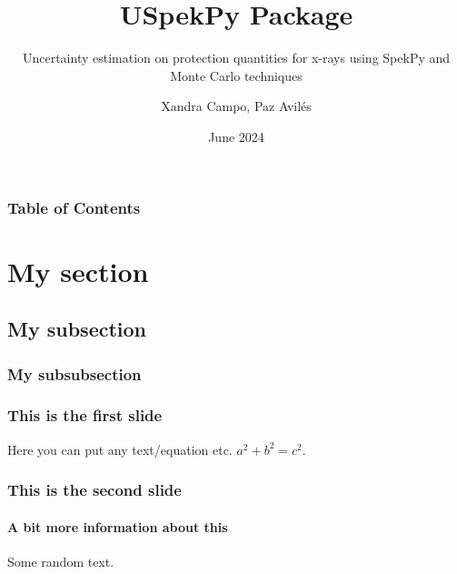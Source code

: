 \documentclass{beamer}
\title{USpekPy Package}
\subtitle{Uncertainty estimation on protection quantities for x-rays using SpekPy and Monte Carlo techniques}
\author{Xandra Campo, Paz Avilés}
\institute{Ionizing Radiation Metrology Laboratory (LMRI) \newline CIEMAT, Spain}
\date{June 2024}
\begin{document}
	\maketitle
	\begin{frame}
		\frametitle{Table of Contents}
		\tableofcontents
	\end{frame}
	\section[Section]{My section}
	\subsection[Subsection]{My subsection}
	\subsubsection[Subsubsection]{My subsubsection}
	\begin{frame}
		\frametitle{This is the first slide}
		Here you can put any text/equation etc. 
		$a^2 + b^2 = c^2$.		
	\end{frame}
	\begin{frame}
		\frametitle{This is the second slide}
		\framesubtitle{A bit more information about this}
		Some random text.		
	\end{frame}
\end{document}

